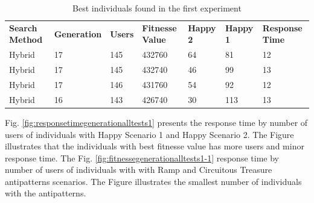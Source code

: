 \documentclass[times]{stvrauth}
\begin{document}
\begin{table}[h]
\centering
\caption{Best individuals found in the first experiment}
\label{tab:bestindividuals}
\begin{tabular}{lllllll}
\rowcolor[HTML]{C0C0C0} 
\textbf{Search Method} & \textbf{Generation} & \textbf{Users} & \textbf{Fitnesse Value} & \textbf{Happy 2} & \textbf{Happy 1} & \textbf{Response Time} \\
Hybrid & 17 & 145 & 432760 & 64 & 81 & 12 \\
Hybrid & 17 & 145 & 432740 & 46 & 99 & 13 \\
Hybrid & 17 & 146 & 431760 & 54 & 92 & 12 \\
Hybrid & 16 & 143 & 426740 & 30 & 113 & 13
\end{tabular}
\end{table}

Fig. \ref{fig:responsetimegenerationalltests1} presents the response time by number of users of individuals with Happy Scenario 1 and Happy Scenario 2. The Figure illustrates that the individuals with best fitnesse value has more users and minor response time. The Fig. \ref{fig:fitnessegenerationalltests1-1} response time by number of users of individuals with with Ramp and Circuitous Treasure antipatterns scenarios. The Figure illustrates the smallest number of individuals with the antipatterns.
\end{document}
